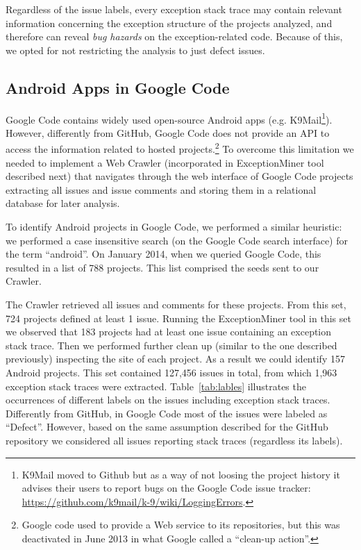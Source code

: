 \documentclass[conference]{IEEEtran}
\begin{document}
Regardless of the issue labels, every exception stack
trace may contain relevant information concerning the exception structure of the
projects analyzed, and therefore can reveal \emph{bug hazards} on the exception-related code.
Because of this, we opted for not restricting the analysis to just defect issues.


\subsection{Android Apps in Google Code}
Google Code contains widely used open-source Android apps (e.g. K9Mail\footnote{K9Mail moved to Github but as a way of not loosing the project history it advises their users to report bugs on the Google Code issue tracker: \url{https://github.com/k9mail/k-9/wiki/LoggingErrors}.}).
However, differently from GitHub, Google Code does not provide an API to access the information related
 to hosted projects.\footnote{Google code used to provide a Web service to its repositories, but this was deactivated in June 2013 in what Google called a ``clean-up action''.}
To overcome this limitation we needed to implement a Web Crawler (incorporated in ExceptionMiner tool described next) that navigates 
through the web interface of Google Code projects extracting all issues and issue comments and storing them in a relational database for later analysis.

To identify Android projects in Google Code, we performed a similar heuristic: we performed a case insensitive search 
(on the Google Code search interface) for the term ``android''. On January 2014, when we queried Google Code, this resulted in a list of 788  projects. This list comprised the seeds sent to our Crawler.

The Crawler retrieved all issues and comments for these projects.
From this set, 724 projects defined at least 1 issue. Running the ExceptionMiner tool 
 in this set we observed that 183 projects had at least one issue containing an exception stack trace.
 Then we performed further clean up (similar to the one described previously) inspecting the site 
of each project. As a result we could identify 157 Android projects.  This set contained  127,456 issues in total,
 from which 1,963 exception stack traces were extracted. Table~\ref{tab:lables} illustrates the occurrences of different labels 
on the issues including exception stack traces. Differently from GitHub, in Google Code most of 
the issues were labeled as ``Defect''. However, based on the same assumption described for the GitHub repository
 we considered all issues reporting stack traces (regardless its labels).
\end{document}
